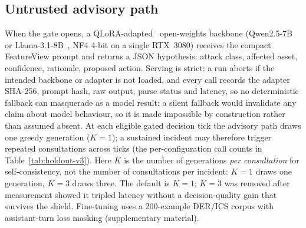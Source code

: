 \subsection{Untrusted advisory path}
\label{sec:method-advisory}
When the gate opens, a QLoRA-adapted~\cite{Dettmers2023_QLoRA} open-weights
backbone (Qwen2.5-7B~\cite{Hu2024_Qwen25} or
Llama-3.1-8B~\cite{Dubey2024_Llama31}, NF4 4-bit on a single RTX~3080) receives the compact
FeatureView prompt and returns a JSON hypothesis: attack class, affected
asset, confidence, rationale, proposed action. Serving is strict: a run
aborts if the intended backbone or adapter is not loaded, and every call
records the adapter SHA-256, prompt hash, raw output, parse status and
latency, so no deterministic fallback can masquerade as a model result:
a silent fallback would invalidate any claim about model behaviour, so it
is made impossible by construction rather than assumed absent.
At each eligible gated decision tick the advisory path draws one greedy
generation ($K{=}1$); a sustained incident may therefore trigger repeated
consultations across ticks (the per-configuration call counts in
Table~\ref{tab:holdout-v3}). Here $K$ is the number of generations \emph{per
consultation} for self-consistency, not the number of consultations per
incident: $K{=}1$ draws one generation, $K{=}3$ draws three. The default is
$K{=}1$; $K{=}3$ was removed after measurement showed it tripled latency without
a decision-quality gain that survives the shield. Fine-tuning uses a 200-example
DER/ICS corpus with assistant-turn loss masking (supplementary material).


